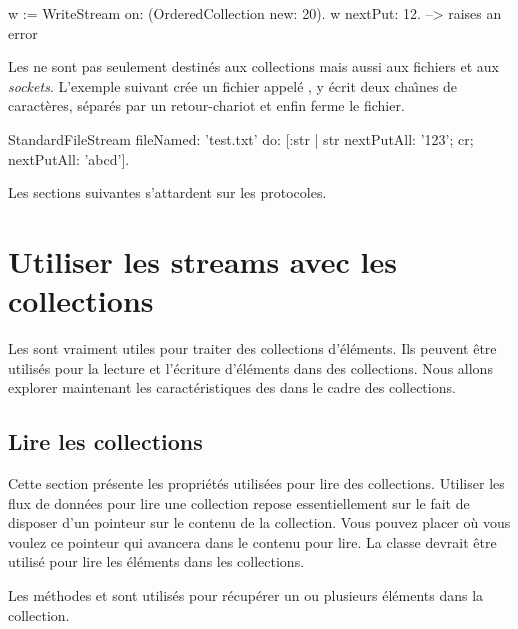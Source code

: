 \documentclass[a4paper,10pt,twoside]{book}
\begin{document}
\begin{code}{}
w := WriteStream on: (OrderedCollection new: 20).
w nextPut: 12. -->  raises an error
\end{code}

Les \streams ne sont pas seulement destin\'es aux collections mais
aussi aux fichiers et aux \emph{sockets}.
L'exemple suivant cr\'ee un fichier appel\'e , 
y \'ecrit deux cha\^{\i}nes de caract\`eres, s\'epar\'es par un retour-chariot et enfin ferme le fichier.

\begin{code}{}
StandardFileStream
  fileNamed: 'test.txt'
  do: [:str | str
                nextPutAll: '123';
                cr;
                nextPutAll: 'abcd'].
\end{code}

Les sections suivantes s'attardent sur les protocoles.

\section{Utiliser les streams avec les collections}

Les \streams sont vraiment utiles pour traiter des collections d'\'el\'ements.
Ils peuvent \^etre utilis\'es pour la lecture et l'\'ecriture d'\'el\'ements
dans des collections. Nous allons explorer maintenant les caract\'eristiques
des \streams dans le cadre des collections.

\subsection{Lire les collections}

Cette section pr\'esente les propri\'et\'es utilis\'ees pour lire des collections. Utiliser les flux de donn\'ees pour lire une collection 
repose essentiellement sur le fait de disposer d'un pointeur sur le contenu de la collection.
Vous pouvez placer o\`u vous voulez ce pointeur qui avancera dans le contenu pour lire.
La classe  devrait \^etre utilis\'e pour lire les \'el\'ements dans les collections.

Les m\'ethodes  et  
sont utilis\'es pour r\'ecup\'erer un ou plusieurs \'el\'ements dans
la collection.
\end{document}
